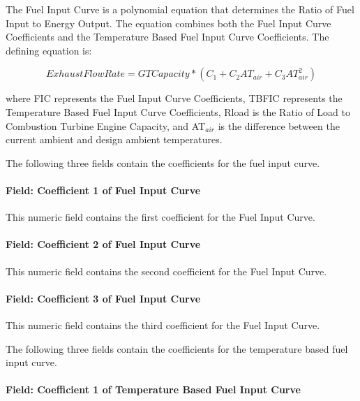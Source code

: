 The Fuel Input Curve is a polynomial equation that determines the Ratio of Fuel Input to Energy Output. The equation combines both the Fuel Input Curve Coefficients and the Temperature Based Fuel Input Curve Coefficients. The defining equation is:

\begin{equation}
    ExhaustFlowRate = GTCapacity * ({C_1} + {C_2}A{T_{air}} + {C_3}AT_{air}^2)
\end{equation}

where FIC represents the Fuel Input Curve Coefficients, TBFIC represents the Temperature Based Fuel Input Curve Coefficients, Rload is the Ratio of Load to Combustion Turbine Engine Capacity, and AT\(_{air}\) is the difference between the current ambient and design ambient temperatures.

The following three fields contain the coefficients for the fuel input curve.

\paragraph{Field: Coefficient 1 of Fuel Input Curve}\label{field-coefficient-1-of-fuel-input-curve}

This numeric field contains the first coefficient for the Fuel Input Curve.

\paragraph{Field: Coefficient 2 of Fuel Input Curve}\label{field-coefficient-2-of-fuel-input-curve}

This numeric field contains the second coefficient for the Fuel Input Curve.

\paragraph{Field: Coefficient 3 of Fuel Input Curve}\label{field-coefficient-3-of-fuel-input-curve}

This numeric field contains the third coefficient for the Fuel Input Curve.

The following three fields contain the coefficients for the temperature based fuel input curve.

\paragraph{Field: Coefficient 1 of Temperature Based Fuel Input Curve}\label{field-coefficient-1-of-temperature-based-fuel-input-curve}

